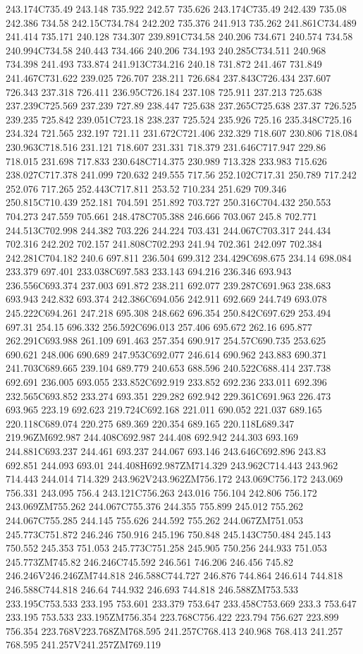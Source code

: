 243.174C735.49 243.148 735.922 242.57 735.626 243.174C735.49 242.439 735.08 242.386 734.58 242.15C734.784 242.202 735.376 241.913 735.262 241.861C734.489 241.414 735.171 240.128 734.307 239.891C734.58 240.206 734.671 240.574 734.58 240.994C734.58 240.443 734.466 240.206 734.193 240.285C734.511 240.968 734.398 241.493 733.874 241.913C734.216 240.18 731.872 241.467 731.849 241.467C731.622 239.025 726.707 238.211 726.684 237.843C726.434 237.607 726.343 237.318 726.411 236.95C726.184 237.108 725.911 237.213 725.638 237.239C725.569 237.239 727.89 238.447 725.638 237.265C725.638 237.37 726.525 239.235 725.842 239.051C723.18 238.237 725.524 235.926 725.16 235.348C725.16 234.324 721.565 232.197 721.11 231.672C721.406 232.329 718.607 230.806 718.084 230.963C718.516 231.121 718.607 231.331 718.379 231.646C717.947 229.86 718.015 231.698 717.833 230.648C714.375 230.989 713.328 233.983 715.626 238.027C717.378 241.099 720.632 249.555 717.56 252.102C717.31 250.789 717.242 252.076 717.265 252.443C717.811 253.52 710.234 251.629 709.346 250.815C710.439 252.181 704.591 251.892 703.727 250.316C704.432 250.553 704.273 247.559 705.661 248.478C705.388 246.666 703.067 245.8 702.771 244.513C702.998 244.382 703.226 244.224 703.431 244.067C703.317 244.434 702.316 242.202 702.157 241.808C702.293 241.94 702.361 242.097 702.384 242.281C704.182 240.6 697.811 236.504 699.312 234.429C698.675 234.14 698.084 233.379 697.401 233.038C697.583 233.143 694.216 236.346 693.943 236.556C693.374 237.003 691.872 238.211 692.077 239.287C691.963 238.683 693.943 242.832 693.374 242.386C694.056 242.911 692.669 244.749 693.078 245.222C694.261 247.218 695.308 248.662 696.354 250.842C697.629 253.494 697.31 254.15 696.332 256.592C696.013 257.406 695.672 262.16 695.877 262.291C693.988 261.109 691.463 257.354 690.917 254.57C690.735 253.625 690.621 248.006 690.689 247.953C692.077 246.614 690.962 243.883 690.371 241.703C689.665 239.104 689.779 240.653 688.596 240.522C688.414 237.738 692.691 236.005 693.055 233.852C692.919 233.852 692.236 233.011 692.396 232.565C693.852 233.274 693.351 229.282 692.942 229.361C691.963 226.473 693.965 223.19 692.623 219.724C692.168 221.011 690.052 221.037 689.165 220.118C689.074 220.275 689.369 220.354 689.165 220.118L689.347 219.96ZM692.987 244.408C692.987 244.408 692.942 244.303 693.169 244.881C693.237 244.461 693.237 244.067 693.146 243.646C692.896 243.83 692.851 244.093 693.01 244.408H692.987ZM714.329 243.962C714.443 243.962 714.443 244.014 714.329 243.962V243.962ZM756.172 243.069C756.172 243.069 756.331 243.095 756.4 243.121C756.263 243.016 756.104 242.806 756.172 243.069ZM755.262 244.067C755.376 244.355 755.899 245.012 755.262 244.067C755.285 244.145 755.626 244.592 755.262 244.067ZM751.053 245.773C751.872 246.246 750.916 245.196 750.848 245.143C750.484 245.143 750.552 245.353 751.053 245.773C751.258 245.905 750.256 244.933 751.053 245.773ZM745.82 246.246C745.592 246.561 746.206 246.456 745.82 246.246V246.246ZM744.818 246.588C744.727 246.876 744.864 246.614 744.818 246.588C744.818 246.64 744.932 246.693 744.818 246.588ZM753.533 233.195C753.533 233.195 753.601 233.379 753.647 233.458C753.669 233.3 753.647 233.195 753.533 233.195ZM756.354 223.768C756.422 223.794 756.627 223.899 756.354 223.768V223.768ZM768.595 241.257C768.413 240.968 768.413 241.257 768.595 241.257V241.257ZM769.119 